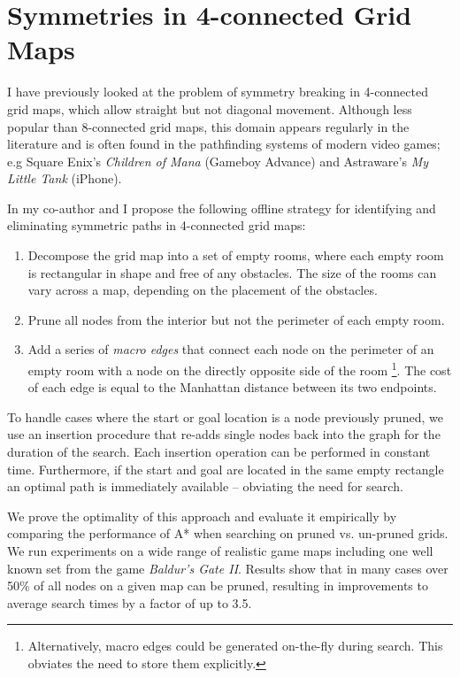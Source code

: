 \section{Symmetries in 4-connected Grid Maps}
\label{sec:currentwork}
I have previously looked at the problem of symmetry breaking in 4-connected
grid maps, which allow straight but not diagonal movement.  Although less popular
than 8-connected grid maps, this domain appears regularly in the literature
\cite{yap02} and is often found in the pathfinding systems of
modern video games; e.g Square Enix's \emph{Children of Mana} (Gameboy Advance)
and Astraware's \emph{My Little Tank} (iPhone).
\par 
In \cite{harabor10} my co-author and I propose the following offline strategy 
for identifying and eliminating symmetric paths in 4-connected grid maps:
\begin{enumerate}
\item{Decompose the grid map into a set of empty rooms, where each empty room is 
rectangular in shape and free of any obstacles. 
The size of the rooms can vary across a map, depending
on the placement of the obstacles.}
\item{Prune all nodes from the interior but not the perimeter of each empty
room.}
\item{Add a series of \emph{macro edges} that connect each node on the perimeter of an empty room
with a node on the directly opposite side of the room 
\footnote{Alternatively, macro edges could be generated on-the-fly during search. 
This obviates the need to store them explicitly.}.
The cost of each edge is equal to the Manhattan distance between its two endpoints.
}
\end{enumerate}

To handle cases where the start or goal location is a node previously pruned, we
use an insertion procedure that re-adds single nodes back into the graph for the
duration of the search.
Each insertion operation can be performed in constant time.
Furthermore, if the start and goal are located in the same empty rectangle
an optimal path is immediately available -- obviating the need for search.
\par
We prove the optimality of this approach and evaluate it empirically by 
comparing the performance of A* when searching on pruned vs. un-pruned grids.
We run experiments on a wide range of realistic game maps including one well
known set from the game \emph{Baldur's Gate II}.  Results show that in many
cases over 50\% of all nodes on a given map can be pruned, resulting in
improvements to average search times by a factor of up to 3.5.

